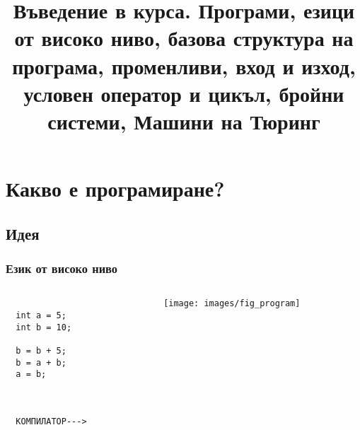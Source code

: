\documentclass{beamer}
\begin{document}
\title[Увод в курса]{Въведение в курса. Програми, езици от високо ниво, базова структура на програма, променливи, вход и изход, условен оператор и цикъл, бройни системи, Машини на Тюринг}
\frame{\titlepage}

\section{Какво е програмиране?}
\subsection{Идея}







\begin{frame}[fragile]
\frametitle{Език от високо ниво}

\begin{columns}
  \begin{column}{0.2\textwidth}
\begin{verbatim}

  int a = 5;
  int b = 10;

  b = b + 5;
  b = a + b;
  a = b;



  КОМПИЛАТОР--->

\end{verbatim}
  \end{column}
  \begin{column}{0.8\textwidth}
\begin{figure}
\texttt{[image: images/fig\_program]}
\end{figure}

  \end{column}
\end{columns}


\end{frame}
\end{document}

